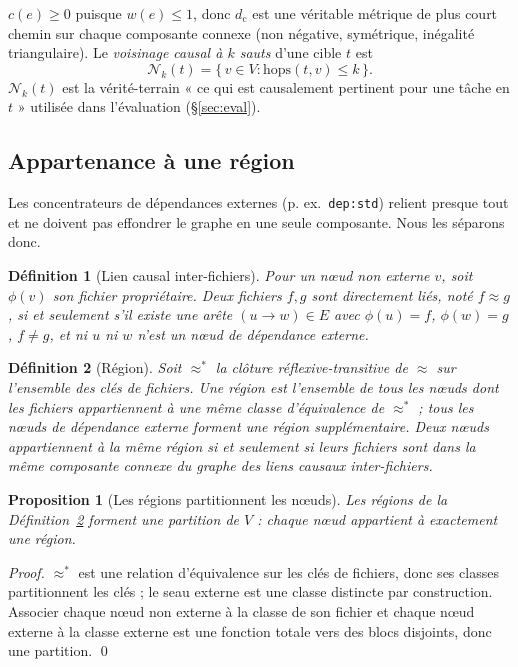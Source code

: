 \documentclass[11pt]{article}
\newtheorem{definition}{Définition}
\newtheorem{proposition}{Proposition}
\newcommand{\dcausal}{d_{\mathrm{c}}}
\newcommand{\Nk}{\mathcal{N}_k}
\newcommand{\code}[1]{\texttt{#1}}
\begin{document}
$c(e)\ge 0$ puisque $w(e)\le 1$, donc $\dcausal$ est une véritable métrique de plus
court chemin sur chaque composante connexe (non négative, symétrique, inégalité
triangulaire). Le \emph{voisinage causal à $k$ sauts} d'une cible $t$ est
\begin{equation}
\Nk(t) = \{\, v \in V : \mathrm{hops}(t,v) \le k \,\}.
\end{equation}
$\Nk(t)$ est la vérité-terrain « ce qui est causalement pertinent pour une tâche en
$t$ » utilisée dans l'évaluation (\S\ref{sec:eval}).

\subsection{Appartenance à une région}

Les concentrateurs de dépendances externes (p. ex.\ \code{dep:std}) relient presque
tout et ne doivent pas effondrer le graphe en une seule composante. Nous les
séparons donc.

\begin{definition}[Lien causal inter-fichiers]
Pour un nœud non externe $v$, soit $\phi(v)$ son fichier propriétaire. Deux fichiers
$f,g$ sont \emph{directement liés}, noté $f \approx g$, si et seulement s'il existe
une arête $(u\!\to\!w)\in E$ avec $\phi(u)=f$, $\phi(w)=g$, $f\neq g$, et ni $u$ ni
$w$ n'est un nœud de dépendance externe.
\end{definition}

\begin{definition}[Région]\label{def:region}
Soit $\approx^{*}$ la clôture réflexive-transitive de $\approx$ sur l'ensemble des
clés de fichiers. Une \emph{région} est l'ensemble de tous les nœuds dont les
fichiers appartiennent à une même classe d'équivalence de $\approx^{*}$ ; tous les
nœuds de dépendance externe forment une région supplémentaire. Deux nœuds
appartiennent à la même région si et seulement si leurs fichiers sont dans la même
composante connexe du graphe des liens causaux inter-fichiers.
\end{definition}

\begin{proposition}[Les régions partitionnent les nœuds]
Les régions de la Définition~\ref{def:region} forment une partition de $V$ : chaque
nœud appartient à exactement une région.
\end{proposition}
\begin{proof}
$\approx^{*}$ est une relation d'équivalence sur les clés de fichiers, donc ses
classes partitionnent les clés ; le seau externe est une classe distincte par
construction. Associer chaque nœud non externe à la classe de son fichier et chaque
nœud externe à la classe externe est une fonction totale vers des blocs disjoints,
donc une partition. \qed
\end{proof}
\end{document}
